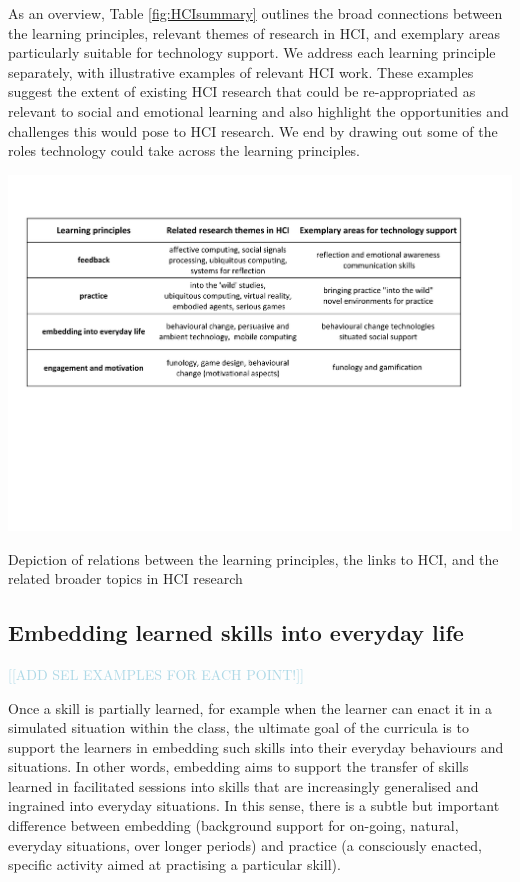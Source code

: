 \documentclass[prodmode,acmtochi]{acmsmall}
\newcommand{\todo}[1]{\textrm{\textrm{\textcolor{LightBlue}{[[#1]]} } } }
\newcommand{\GeraldineFIX}[1]{}
\begin{document}
As an overview,  Table \ref{fig:HCIsummary} outlines the broad connections between the learning principles, relevant themes of research in HCI, and exemplary areas particularly suitable for technology support. We address each learning principle separately, with illustrative examples of relevant HCI work. These examples suggest the extent of existing HCI research that could be re-appropriated as relevant to social and emotional learning and also highlight the opportunities and challenges this would pose to HCI research. We end by drawing out some of the roles technology could take across the learning principles. 


\begin{table}
  \centering
        \includegraphics[width=\textwidth]{images/SummaryHCI.pdf}
        \caption{Depiction of relations between the learning  principles, the links to HCI, and the related broader topics in HCI research}
        \label{fig:HCIsummary}
\end{table}
\GeraldineFIX{ G: subtopics for feedback - reflect all of topics from earlier?; add 'scaffodling practise in class under practice subtopics?}
\fi


\subsection{Embedding learned skills into everyday life} 
\todo{ADD SEL EXAMPLES FOR EACH POINT!}

Once a skill is partially learned, for example when the learner can enact it in a simulated situation within the class, the ultimate goal of the curricula is to support the learners in embedding such skills into their everyday behaviours and situations. In other words, embedding aims to support the transfer of skills learned in facilitated sessions into skills that are increasingly generalised and ingrained into everyday situations. In this sense, there is a subtle but important difference between embedding (background support for on-going, natural, everyday situations, over longer periods) and practice (a consciously enacted, specific activity aimed at practising a particular skill).
\end{document}
